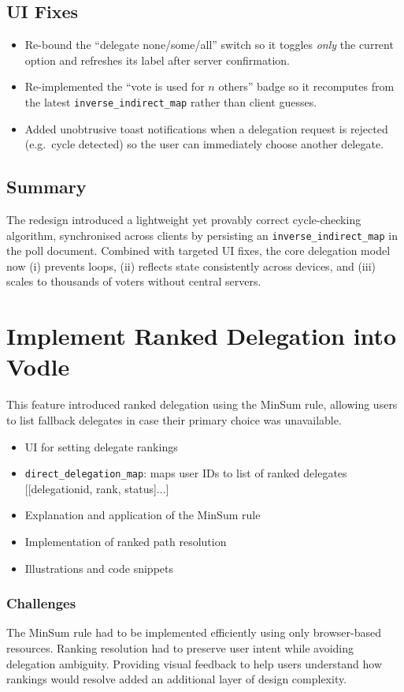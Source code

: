 \subsection{UI Fixes}
\begin{itemize}
  \item Re-bound the ``delegate none/some/all'' switch so it toggles \emph{only} the current option and refreshes its label after server confirmation.
  \item Re-implemented the ``vote is used for \(n\) others'' badge so it recomputes from the latest \texttt{inverse\_indirect\_map} rather than client guesses.
  \item Added unobtrusive toast notifications when a delegation request is rejected (e.g.\ cycle detected) so the user can immediately choose another delegate.
\end{itemize}

\subsection{Summary}
The redesign introduced a lightweight yet provably correct cycle-checking algorithm, synchronised across clients by persisting an \texttt{inverse\_indirect\_map} in the poll document. Combined with targeted UI fixes, the core delegation model now (i) prevents loops, (ii) reflects state consistently across devices, and (iii) scales to thousands of voters without central servers.


\section{Implement Ranked Delegation into Vodle}
This feature introduced ranked delegation using the MinSum rule, allowing users to list fallback delegates in case their primary choice was unavailable.

\begin{itemize}
  \item UI for setting delegate rankings
  \item \verb|direct_delegation_map|: maps user IDs to list of ranked delegates [[delegationid, rank, status]...]
  \item Explanation and application of the MinSum rule
  \item Implementation of ranked path resolution
  \item Illustrations and code snippets
\end{itemize}

\subsubsection{Challenges}
The MinSum rule had to be implemented efficiently using only browser-based resources. Ranking resolution had to preserve user intent while avoiding delegation ambiguity. Providing visual feedback to help users understand how rankings would resolve added an additional layer of design complexity.

